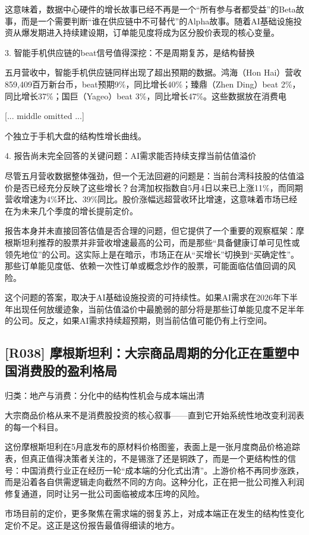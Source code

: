 \documentclass[11pt]{ctexart}
\begin{document}
这意味着，数据中心硬件的增长故事已经不再是一个“所有参与者都受益”的Beta故事，而是一个需要判断“谁在供应链中不可替代”的Alpha故事。随着AI基础设施投资从爆发期进入持续建设期，订单能见度将成为区分股价表现的核心变量。

3. 智能手机供应链的beat信号值得深挖：不是周期复苏，是结构替换

五月营收中，智能手机供应链同样出现了超出预期的数据。鸿海（Hon Hai）营收859,409百万新台币，beat预期9\%，同比增长40\%；臻鼎（Zhen Ding）beat 2\%，同比增长37\%；国巨（Yageo）beat 3\%，同比增长47\%。这些数据放在消费电

[... middle omitted ...]

个独立于手机大盘的结构性增长曲线。

4. 报告尚未完全回答的关键问题：AI需求能否持续支撑当前估值溢价

尽管五月营收数据整体强劲，但一个无法回避的问题是：当前台湾科技股的估值溢价是否已经充分反映了这些增长？台湾加权指数自5月4日以来已上涨11\%，而同期营收增速为4\%环比、39\%同比。股价涨幅远超营收环比增速，这意味着市场已经在为未来几个季度的增长提前定价。

报告本身并未直接回答估值是否合理的问题，但它提供了一个重要的观察框架：摩根斯坦利推荐的股票并非营收增速最高的公司，而是那些“具备健康订单可见性或领先地位”的公司。这实际上是在暗示，市场正在从“买增长”切换到“买确定性”。那些订单能见度低、依赖一次性订单或概念炒作的股票，可能面临估值回调的风险。

这个问题的答案，取决于AI基础设施投资的可持续性。如果AI需求在2026年下半年出现任何放缓迹象，当前估值溢价中最脆弱的部分将是那些订单能见度不足半年的公司。反之，如果AI需求持续超预期，则当前估值可能仍有上行空间。

\subsection{[R038] 摩根斯坦利：大宗商品周期的分化正在重塑中国消费股的盈利格局}
{\small\color{refgray}归类：地产与消费：分化中的结构性机会与成本端出清}

大宗商品价格从来不是消费股投资的核心叙事——直到它开始系统性地改变利润表的每一个科目。

这份摩根斯坦利在5月底发布的原材料价格图鉴，表面上是一张月度商品价格追踪表，但真正值得决策者关注的，不是锡涨了还是铜跌了，而是一个更结构性的信号：中国消费行业正在经历一轮“成本端的分化式出清”。上游价格不再同步涨跌，而是沿着各自供需逻辑走向截然不同的方向。这种分化，正在把一批公司推入利润修复通道，同时让另一批公司面临被成本压垮的风险。

市场目前的定价，更多聚焦在需求端的弱复苏上，对成本端正在发生的结构性变化定价不足。这正是这份报告最值得细读的地方。
\end{document}
